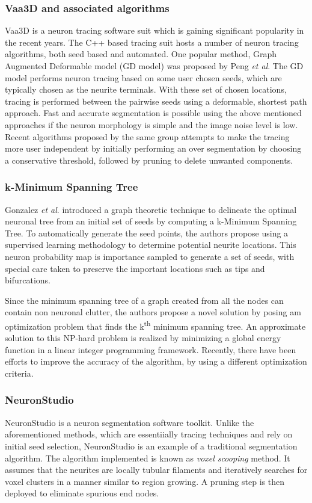\subsubsection{Vaa3D and associated algorithms}
Vaa3D\cite{peng_v3d} is a neuron tracing software suit which is gaining significant popularity in the recent years. The C++ based tracing suit hosts a number of neuron tracing algorithms, both seed based and automated. One popular method, Graph Augmented Deformable model (GD model) was proposed by Peng \textit{et al}\cite{peng_GAD}. The GD model performs neuron tracing based on some user chosen seeds, which are typically chosen as the neurite terminals. With these set of chosen locations, tracing is performed between the pairwise seeds using a deformable, shortest path approach. Fast and accurate segmentation is possible using the above mentioned approaches if the neuron morphology is simple and the image noise level is low. Recent algorithms proposed by the same group \cite{peng_anisotropicPS,peng_APP} attempts to make the tracing more user independent by initially performing an over segmentation by choosing a conservative threshold, followed by pruning to delete unwanted components. 

\subsubsection{k-Minimum Spanning Tree}
Gonzalez \textit{et al}. \cite{turetken_Diadem} introduced a graph theoretic technique to delineate the optimal neuronal tree from an initial set of seeds by computing a k-Minimum Spanning Tree. To automatically generate the seed points, the authors propose using a supervised learning methodology to determine potential neurite locations. This neuron probability map is importance sampled to generate a set of seeds, with special care taken to preserve the important locations such as tips and bifurcations. 

Since the minimum spanning tree of a graph created from all the nodes can contain non neuronal clutter, the authors propose a novel solution by posing am optimization problem that finds the k\textsuperscript{th} minimum spanning tree. An approximate solution to this NP-hard problem is realized by minimizing a global energy function in a linear integer programming framework. Recently, there have been efforts to improve the accuracy of the algorithm, by using a different optimization criteria\cite{turetken_MIP}. 

\subsubsection{NeuronStudio}
NeuronStudio\cite{wearne_neuronStudio} is a neuron segmentation software toolkit. Unlike the aforementioned methods, which are essentiially tracing techniques and rely on initial seed selection, NeuronStudio is an example of a traditional segmentation algorithm. The algorithm implemented is known as \textit{voxel scooping} method\cite{rodriguez_voxelscoop}. It assumes that the neurites are locally tubular filaments and iteratively searches for voxel clusters in a manner similar to region growing. A pruning step is then deployed to eliminate spurious end nodes.

